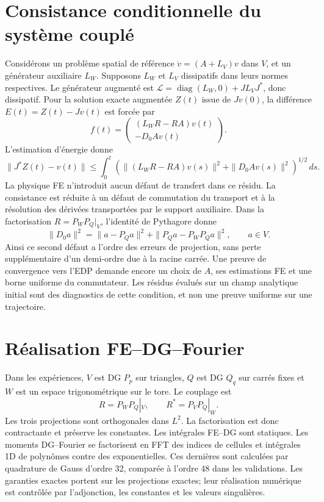 \documentclass[11pt,a4paper]{article}
\begin{document}
\section{Consistance conditionnelle du système couplé}
Considérons un problème spatial de référence
$\dot v=(A+L_V)v$ dans $V$, et un générateur auxiliaire $L_W$.
Supposons $L_W$ et $L_V$ dissipatifs dans leurs normes respectives.
Le générateur augmenté est
$\mathcal L=\operatorname{diag}(L_W,0)+JL_VJ^*$, donc dissipatif.
Pour la solution exacte augmentée $Z(t)$ issue de $Jv(0)$,
la différence $E(t)=Z(t)-Jv(t)$ est forcée par
\[
 f(t)=
 \begin{pmatrix}
  (L_WR-RA)v(t)\\-D_0Av(t)
 \end{pmatrix}.
\]
L'estimation d'énergie donne
\[
 \|J^*Z(t)-v(t)\|
 \leq \int_0^t
 \left(\|(L_WR-RA)v(s)\|^2+\|D_0Av(s)\|^2\right)^{1/2}\,ds.
\]
La physique FE n'introduit aucun défaut de transfert dans ce résidu.
La consistance est réduite à un défaut de commutation du transport et à
la résolution des dérivées transportées par le support auxiliaire.
Dans la factorisation $R=P_WP_Q|_V$, l'identité de Pythagore donne
\[
 \|D_0a\|^2
 =\|a-P_Qa\|^2+\|P_Qa-P_WP_Qa\|^2,\qquad a\in V.
\]
Ainsi ce second défaut a l'ordre des erreurs de projection, sans perte
supplémentaire d'un demi-ordre due à la racine carrée.
Une preuve de convergence vers l'EDP demande encore un choix de $A$,
ses estimations FE et une borne uniforme du commutateur.
Les résidus évalués sur un champ analytique initial sont des diagnostics
de cette condition, et non une preuve uniforme sur une trajectoire.

\section{Réalisation FE--DG--Fourier}
Dans les expériences, $V$ est DG $P_p$ sur triangles, $Q$ est DG $Q_q$
sur carrés fixes et $W$ est un espace trigonométrique sur le tore.
Le couplage est
\[
 R=P_WP_Q|_V,\qquad R^*=P_VP_Q|_W .
\]
Les trois projections sont orthogonales dans $L^2$. La factorisation est
donc contractante et préserve les constantes. Les intégrales FE--DG sont
statiques. Les moments DG--Fourier se factorisent en FFT des indices de
cellules et intégrales 1D de polynômes contre des exponentielles.
Ces dernières sont calculées par quadrature de Gauss d'ordre 32,
comparée à l'ordre 48 dans les validations. Les garanties exactes portent
sur les projections exactes; leur réalisation numérique est contrôlée
par l'adjonction, les constantes et les valeurs singulières.
\end{document}

